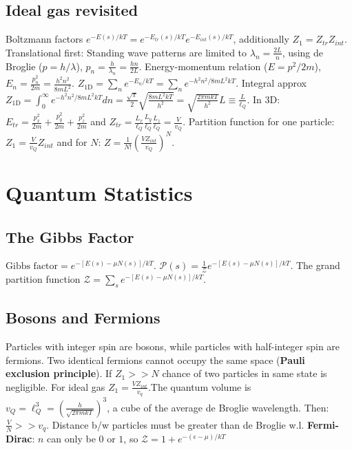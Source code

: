 \documentclass[11pt,twocolumn]{amsart}
\begin{document}
\subsection{Ideal gas revisited}
Boltzmann factors $ e^{-E(s)/kT} = e^{-E_{tr}(s)/kT} e^{-E_{int}(s)/kT} $, additionally $ Z_1 = Z_{tr} Z_{int} $. Translational first: Standing wave patterns are limited to $ \lambda_n = \frac{2L}{n} $, using de Broglie ($p=h/\lambda$), $ p_n = \frac{h}{\lambda_n}=\frac{hn}{2L} $. Energy-momentum relation ($E=p^2/2m$), $ E_n = \frac{p_n^2}{2m}=\frac{h^2n^2}{8mL^2}$. $ Z_{\text{1D}} = \sum_n e^{-E_n/kT} = \sum_n e^{-h^2n^2/8mL^2 kT}$. Integral approx $ Z_{\text{1D}} = \int_0^{\infty} e^{-h^2n^2/8mL^2 kT} dn = \frac{\sqrt{\pi}}{2} \sqrt{\frac{8mL^2kT}{h^2}} = \sqrt{\frac{2\pi mkT}{h^2}}L \equiv \frac{L}{\ell_Q}$. In 3D: $ E_{tr} = \frac{p_x^2}{2m} + \frac{p_y^2}{2m} + \frac{p_z^2}{2m}$ and $ Z_{tr} = \frac{L_x}{\ell_Q}\frac{L_y}{\ell_Q}\frac{L_z}{\ell_Q} = \frac{V}{v_Q} $. Partition function for one particle: $ Z_1 = \frac{V}{v_Q}Z_{int}$ and for $N$: $ Z = \frac{1}{N!} \left(\frac{V Z_{int}}{v_Q} \right)^N $.

\section{Quantum Statistics}

\subsection{The Gibbs Factor}
$\text{Gibbs factor} = e^{-[E(s)-\mu N(s)]/kT}$. $\mathcal{P}(s) = \frac{1}{\mathcal{Z}}e^{-[E(s)-\mu N(s)]/kT}$. The grand partition function $\mathcal{Z} = \sum_s e^{-[E(s)-\mu N(s)]/kT}$.

\subsection{Bosons and Fermions}
Particles with integer spin are bosons, while particles with half-integer spin are fermions. Two identical fermions cannot occupy the same space (\textbf{Pauli exclusion principle}). If $Z_1 >> N$ chance of two particles in same state is negligible. For ideal gas $Z_1 = \frac{V Z_{int}}{v_q} $.The quantum volume is $ v_Q = \ell_Q^3 = \left( \frac{h}{\sqrt{2\pi mkT}} \right)^3 $, a cube of the average de Broglie wavelength. Then: $ \frac{V}{N} >>v_q$. Distance b/w particles must be greater than de Broglie w.l.
\textbf{Fermi-Dirac}: $n$ can only be $0$ or $1$, so $\mathcal{Z} = 1 + e^{-(\epsilon-\mu)/kT}$
\end{document}
